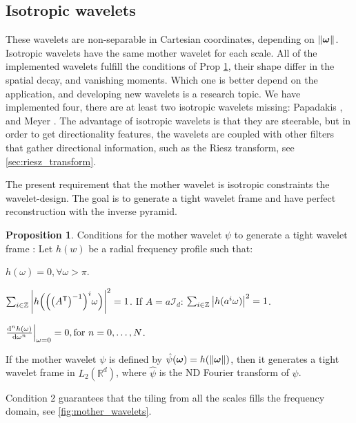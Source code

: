 \documentclass{InsightArticle}
\theoremstyle{definition}
\newtheorem{proposition}{Proposition}
\newcommand{\fft}[1]{\hat{#1}}
\newcommand{\trans}[1]{#1^{\mathsf{T}}}
\def\w{\omega} %
\begin{document}
\subsection{Isotropic wavelets}
\label{sub:isotropic_wavelets}
These wavelets are non-separable in Cartesian coordinates, depending on $\norm{\bm{\omega}}$. Isotropic wavelets have the same mother wavelet for each scale. All of the implemented wavelets fulfill the conditions of Prop \ref{prop:tight_conditions}, their shape differ in the spatial decay, and vanishing moments. Which one is better depend on the application, and developing new wavelets is a research topic. We have implemented four, there are at least \cite{unser_steerable_2011} two isotropic wavelets missing: Papadakis \cite{romero_geometry_2009}, and Meyer \cite{daubechies_ten_1992}.
The advantage of isotropic wavelets is that they are steerable, but in order to get directionality features, the wavelets are coupled with other filters that gather directional information, such as the Riesz transform, see \autoref{sec:riesz_transform}.

The present requirement that the mother wavelet is isotropic constraints the wavelet-design. The goal is to generate a tight wavelet frame and have perfect reconstruction with the inverse pyramid.
\begin{proposition}\label{prop:tight_conditions}
  Conditions for the mother wavelet $\psi$ to generate a tight wavelet frame \cite{held_steerable_2010, unser_steerable_2011, chenouard_3d_2012}:\newline
Let $h(w)$ be a radial frequency profile such that:
\begin{description}[font=\normalfont , leftmargin=*, labelsep=*, labelindent=*]
    \item[1. (Band-limitedness):] $h(\w) = 0, \forall \w > \pi$.
    \item[2. (Riesz Partition of Unity):] $\sum_{i \in \mathbb{Z}} \abs{h\Bigl(\Bigl(\bigl(\trans{A}\bigr)^{-1}\Bigr)^i\w\Bigr)}^2 = 1$.\newline
          If $A = a \mathcal{I}_d$: $\sum_{i \in \mathbb{Z}} \abs{h(a^i\w)}^2 = 1$. \cite{held_steerable_2010, aldroubi_wavelets_2007}
     \item[3. (Vanishing Moments):] $\dv[n]{h(\w)}{\w}\Bigr|_{\w=0} = 0, \text{for } n = 0, \ldots, N$.
\end{description}
If the mother wavelet $\psi$ is defined by $\fft{\psi}(\bm{\w})= h(\norm{\bm{\w}})$, then it generates a tight wavelet frame in $L_2(\mathbb{R}^d)$, where $\fft{\psi}$ is the ND Fourier transform of $\psi$.

Condition 2 guarantees that the tiling from all the scales fills the frequency domain, see \autoref{fig:mother_wavelets}.
\end{proposition}
\end{document}
